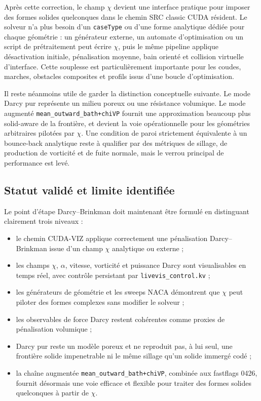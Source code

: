 \documentclass[11pt,a4paper]{article}
\begin{document}
Après cette correction, le champ $\chi$ devient une interface pratique pour imposer des formes solides quelconques dans le chemin SRC classic CUDA résident. Le solveur n'a plus besoin d'un \texttt{caseType} ou d'une forme analytique dédiée pour chaque géométrie : un générateur externe, un automate d'optimisation ou un script de prétraitement peut écrire $\chi$, puis le même pipeline applique désactivation initiale, pénalisation moyenne, bain orienté et collision virtuelle d'interface. Cette souplesse est particulièrement importante pour les coudes, marches, obstacles composites et profils issus d'une boucle d'optimisation.

Il reste néanmoins utile de garder la distinction conceptuelle suivante. Le mode Darcy pur représente un milieu poreux ou une résistance volumique. Le mode augmenté \texttt{mean\_outward\_bath+chiVP} fournit une approximation beaucoup plus solid-aware de la frontière, et devient la voie opérationnelle pour les géométries arbitraires pilotées par $\chi$. Une condition de paroi strictement équivalente à un bounce-back analytique reste à qualifier par des métriques de sillage, de production de vorticité et de fuite normale, mais le verrou principal de performance est levé.

\subsection{Statut validé et limite identifiée}

Le point d'étape Darcy--Brinkman doit maintenant être formulé en distinguant clairement trois niveaux :
\begin{itemize}[leftmargin=*]
  \item le chemin CUDA-VIZ applique correctement une pénalisation Darcy--Brinkman issue d'un champ $\chi$ analytique ou externe ;
  \item les champs $\chi$, $\alpha$, vitesse, vorticité et puissance Darcy sont visualisables en temps réel, avec contrôle persistant par \texttt{livevis\_control.kv} ;
  \item les générateurs de géométrie et les sweeps NACA démontrent que $\chi$ peut piloter des formes complexes sans modifier le solveur ;
  \item les observables de force Darcy restent cohérentes comme proxies de pénalisation volumique ;
  \item Darcy pur reste un modèle poreux et ne reproduit pas, à lui seul, une frontière solide impenetrable ni le même sillage qu'un solide immergé codé ;
  \item la chaîne augmentée \texttt{mean\_outward\_bath+chiVP}, combinée aux fastflags 0426, fournit désormais une voie efficace et flexible pour traiter des formes solides quelconques à partir de $\chi$.
\end{itemize}
\end{document}
